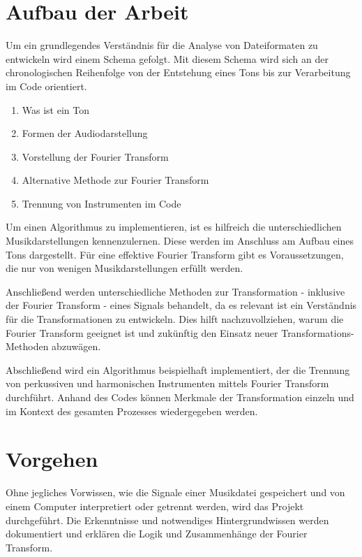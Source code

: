 %
\section{Aufbau der Arbeit}
%

Um ein grundlegendes Verständnis für die Analyse von Dateiformaten zu entwickeln wird einem Schema gefolgt.
Mit diesem Schema wird sich an der chronologischen Reihenfolge von der Entstehung eines Tons bis zur Verarbeitung im Code orientiert.

%
\begin{enumerate}
    \item Was ist ein Ton
    \item Formen der Audiodarstellung
    \item Vorstellung der Fourier Transform
    \item Alternative Methode zur Fourier Transform
    \item Trennung von Instrumenten im Code
\end{enumerate}
%

Um einen Algorithmus zu implementieren, ist es hilfreich die unterschiedlichen Musikdarstellungen kennenzulernen.
Diese werden im Anschluss am Aufbau eines Tons dargestellt.
Für eine effektive Fourier Transform gibt es Voraussetzungen, die nur von wenigen Musikdarstellungen erfüllt werden.

\par

Anschließend werden unterschiedliche Methoden zur Transformation - inklusive der Fourier Transform - eines Signals behandelt, da es relevant ist ein Verständnis für die Transformationen zu entwickeln. Dies hilft nachzuvollziehen, warum die Fourier Transform geeignet ist und zukünftig den Einsatz neuer Transformations-Methoden abzuwägen.

\par

Abschließend wird ein Algorithmus beispielhaft implementiert, der die Trennung von perkussiven und harmonischen Instrumenten mittels Fourier Transform durchführt. Anhand des Codes können Merkmale der Transformation einzeln und im Kontext des gesamten Prozesses wiedergegeben werden.

%
\section{Vorgehen}
%

Ohne jegliches Vorwissen, wie die Signale einer Musikdatei gespeichert und von einem Computer interpretiert oder getrennt werden, wird das Projekt durchgeführt. Die Erkenntnisse und notwendiges Hintergrundwissen werden dokumentiert und erklären die Logik und Zusammenhänge der Fourier Transform. 


